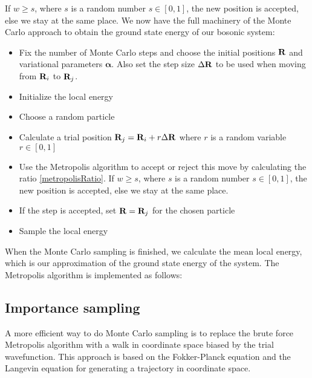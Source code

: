 \documentclass[english, a4paper]{article}
\begin{document}
If $w \geq s$, where $s$ is a random number $s \in [0,1]$, the new position is accepted, else we stay
at the same place.
We now have the full machinery of the Monte Carlo approach to obtain the ground state energy of our bosonic system:
\begin{itemize}
 \item Fix the number of Monte Carlo steps and choose the initial positions ${\bf R}$
       and variational parameters $\boldsymbol{\alpha}$.
       Also set the step size $\Delta {\bf R}$ to be used when moving from ${\bf R}_i$ to ${\bf R}_j$.
 \item Initialize the local energy
 \item Choose a random particle
 \item Calculate a trial position ${\bf R}_j = {\bf R}_i + r  \Delta {\bf R}$ where $r$ is a random variable
       $r \in [0,1]$
 \item Use the Metropolis algorithm to accept or reject this move by calculating the ratio 
       \eqref{metropolisRatio}. 
       If $w \geq s$, where $s$ is a random number $s \in [0,1]$, the new position is accepted, else we stay
       at the same place.
 \item If the step is accepted, set ${\bf R} = {\bf R}_j$ for the chosen particle
 \item Sample the local energy
\end{itemize}
When the Monte Carlo sampling is finished, we calculate the mean local energy, which is our approximation
of the ground state energy of the system.
The Metropolis algorithm is implemented as follows:


\subsection{Importance sampling}

A more efficient way to do Monte Carlo sampling is to replace the brute force Metropolis algorithm
with a walk in coordinate space biased by the trial wavefunction. This approach is based on the 
Fokker-Planck equation and the Langevin equation for generating a trajectory in coordinate space. \\
\end{document}
